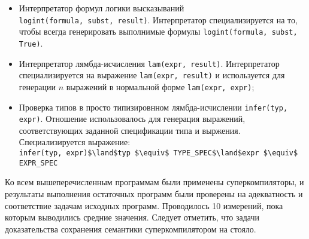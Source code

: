 \begin{itemize}
 \item Интерпретатор формул логики высказываний \\ \lstinline{logint(formula, subst, result)}.
       Интерпретатор специализируется на то, чтобы всегда генерировать выполнимые формулы
       \lstinline{logint(formula, subst, True)}.
 \item Интерпретатор лямбда-исчисления \lstinline{lam(expr, result)}.
       Интерпретатор специализируется на выражение \lstinline{lam(expr, result)}
       и используется для генерации $n$ выражений в нормальной форме \lstinline{lam(expr, expr)};
 \item Проверка типов в просто типизировнном лямбда-исчислении \lstinline{infer(typ, expr)}.
     Отношение использовалось для генерация выражений, соответствующих заданной спецификации типа и выржения.
     Специализируется выражение:\\
 	 \lstinline{infer(typ, expr)$\land$typ $\equiv$ TYPE_SPEC$\land$expr $\equiv$ EXPR_SPEC}
\end{itemize}

Ко всем вышеперечисленным программам были применены суперкомпиляторы, 
и результаты выполнения остаточных программ были проверены на адекватность и соответствие задачам исходных программ.
Проводилось 10 измерений, пока которым выводились средние значения.
Следует отметить, что задачи доказательства сохранения семантики суперкомпилятором на стояло. 

